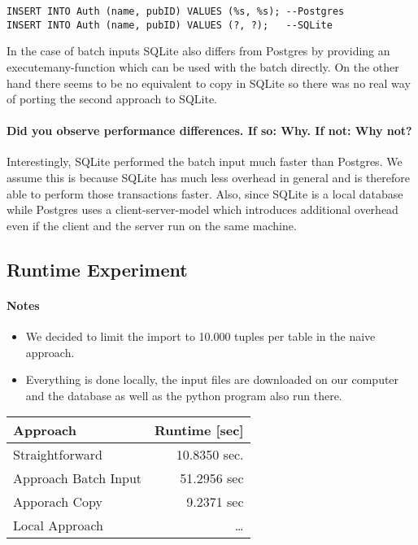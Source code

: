 \documentclass[11pt]{scrartcl}
\begin{document}
\begin{lstlisting}[style=dbtsql]
INSERT INTO Auth (name, pubID) VALUES (%s, %s);	--Postgres
INSERT INTO Auth (name, pubID) VALUES (?, ?);	--SQLite
\end{lstlisting}

In the case of batch inputs SQLite also differs from Postgres by providing an executemany-function which can be used with the batch directly. On the other hand there seems to be no equivalent to copy in SQLite so there was no real way of porting the second approach to SQLite.

\paragraph{Did you observe performance differences. If so: Why. If not: Why not?}

Interestingly, SQLite performed the batch input much faster than Postgres. We assume this is because SQLite has much less overhead in general and is therefore able to perform those transactions faster. Also, since SQLite is a local database while Postgres uses a client-server-model which introduces additional overhead even if the client and the server run on the same machine.

\subsection*{Runtime Experiment}

\paragraph{Notes}

\begin{itemize}
  \item We decided to limit the import to 10.000 tuples per table in the naive approach.
  \item Everything is done locally, the input files are downloaded on our computer and the database as well as the python program also run there.
\end{itemize}

\begin{table}[H]
  \centering
  \begin{tabular}{l|r}
    Approach          & Runtime [sec] \tabularnewline
    \hline
    Straightforward   & 10.8350 sec. \tabularnewline
    Approach Batch Input & 51.2956 sec \tabularnewline
    Apporach Copy & 9.2371 sec \tabularnewline
    Local Approach & \ldots \tabularnewline
  \end{tabular}
\end{table}
\end{document}
